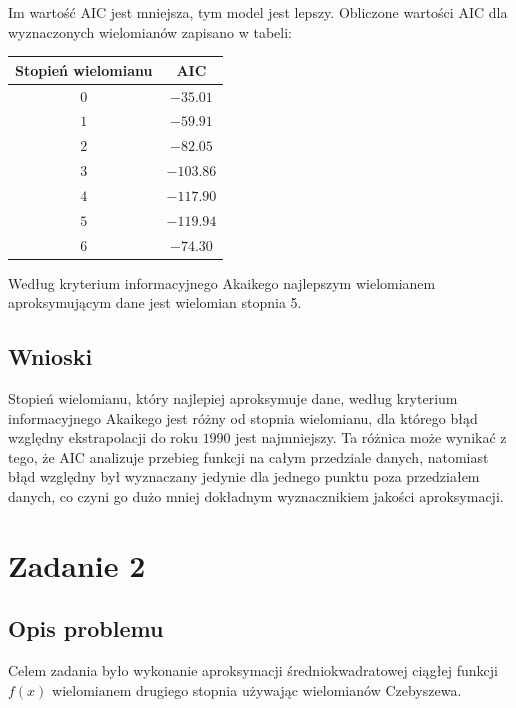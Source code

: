 \documentclass{article}
\begin{document}
	Im wartość AIC jest mniejsza, tym model jest lepszy. Obliczone wartości AIC dla wyznaczonych wielomianów zapisano w tabeli:
	
	\begin{center}
		\begin{tabular}{c|c}
  			\hline 
  			Stopień wielomianu & AIC\\
  			\hline
  			$0$ & $-35.01$ \\
  			$1$ & $-59.91$ \\
  			$2$ & $-82.05$ \\
  			$3$ & $-103.86$ \\
  			$4$ & $-117.90$ \\
  			$5$ & $-119.94$ \\
  			$6$ & $-74.30$ \\
		\end{tabular} 
		
	\end{center}	
	
	
	Według kryterium informacyjnego Akaikego najlepszym wielomianem aproksymującym dane jest wielomian stopnia 5. 
	
	\subsection*{Wnioski}	
	
	Stopień wielomianu, który najlepiej aproksymuje dane, według kryterium informacyjnego Akaikego jest różny od stopnia wielomianu, dla którego błąd względny ekstrapolacji do roku $1990$ jest najmniejszy. Ta różnica może wynikać z tego, że AIC analizuje przebieg funkcji na całym przedziale danych, natomiast błąd względny był wyznaczany jedynie dla jednego punktu poza przedziałem danych, co czyni go dużo mniej dokładnym wyznacznikiem jakości aproksymacji.
	
	\newpage
	
	\section*{Zadanie 2}
	
	\subsection*{Opis problemu}
	
	Celem zadania było wykonanie aproksymacji średniokwadratowej ciągłej funkcji $f(x)$ wielomianem drugiego stopnia używając wielomianów Czebyszewa.
	
\end{document}
